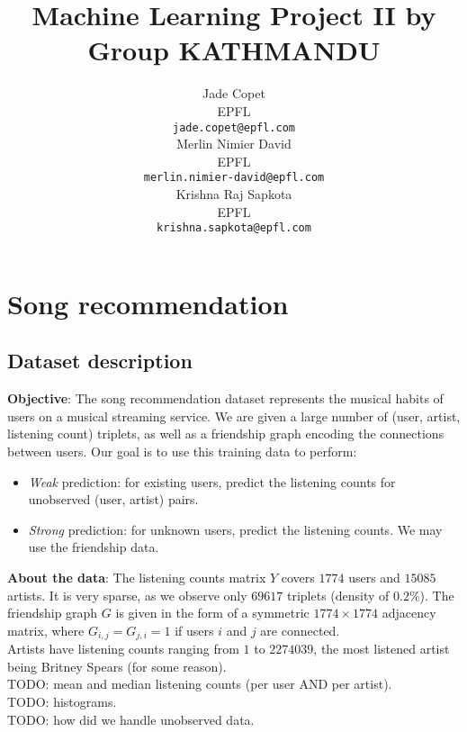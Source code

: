 \documentclass{article}
\title{Machine Learning Project II by Group KATHMANDU}
\author{
  Jade Copet\\
  EPFL \\
  \texttt{jade.copet@epfl.com} \\
  \And
  Merlin Nimier David\\
  EPFL \\
  \texttt{merlin.nimier-david@epfl.com} \\
  \And
  Krishna Raj Sapkota\\
  EPFL \\
  \texttt{krishna.sapkota@epfl.com} \\
}
\begin{document}
\maketitle



\begin{abstract}
\end{abstract}



\section{Song recommendation}

  \subsection{Dataset description}
  \textbf{Objective}: The song recommendation dataset represents the musical habits of users on a musical streaming service. We are given a large number of (user, artist, listening count) triplets, as well as a friendship graph encoding the connections between users. Our goal is to use this training data to perform:

  \begin{itemize}
    \item \textit{Weak} prediction: for existing users, predict the listening counts for unobserved (user, artist) pairs.
    \item \textit{Strong} prediction: for unknown users, predict the listening counts. We may use the friendship data.
  \end{itemize}

  \textbf{About the data}: The listening counts matrix $Y$ covers $1774$ users and $15085$ artists. It is very sparse, as we observe only $69617$ triplets (density of $0.2\%$). The friendship graph $G$ is given in the form of a symmetric $1774 \times 1774$ adjacency matrix, where $G_{i, j} = G_{j, i} = 1$ if users $i$ and $j$ are connected.\\

  Artists have listening counts ranging from $1$ to $2274039$, the most listened artist being Britney Spears (for some reason).\\
  TODO: mean and median listening counts (per user AND per artist).\\
  TODO: histograms.\\

  TODO: how did we handle unobserved data.
\end{document}
